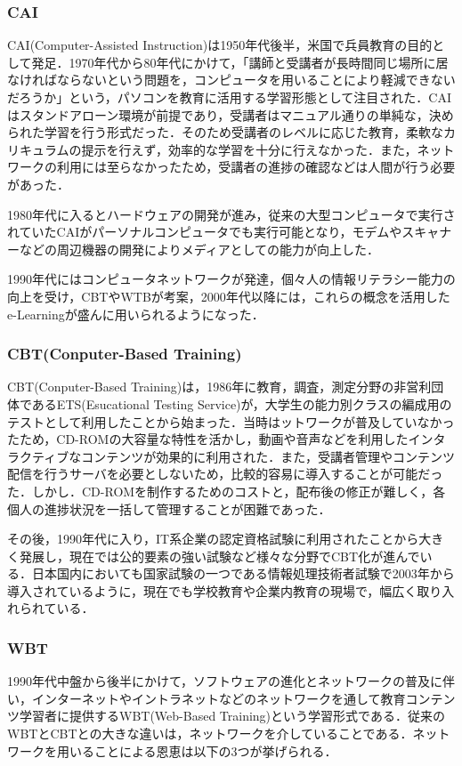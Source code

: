 \documentclass[a4j,12pt]{jsarticle}
\begin{document}
\subsubsection{CAI}
CAI(Computer-Assisted Instruction)は1950年代後半，米国で兵員教育の目的として発足．1970年代から80年代にかけて，「講師と受講者が長時間同じ場所に居なければならないという問題を，コンピュータを用いることにより軽減できないだろうか」という，パソコンを教育に活用する学習形態として注目された．CAIはスタンドアローン環境が前提であり，受講者はマニュアル通りの単純な，決められた学習を行う形式だった．そのため受講者のレベルに応じた教育，柔軟なカリキュラムの提示を行えず，効率的な学習を十分に行えなかった．また，ネットワークの利用には至らなかったため，受講者の進捗の確認などは人間が行う必要があった．

1980年代に入るとハードウェアの開発が進み，従来の大型コンピュータで実行されていたCAIがパーソナルコンピュータでも実行可能となり，モデムやスキャナーなどの周辺機器の開発によりメディアとしての能力が向上した．

1990年代にはコンピュータネットワークが発達，個々人の情報リテラシー能力の向上を受け，CBTやWTBが考案，2000年代以降には，これらの概念を活用したe-Learningが盛んに用いられるようになった．

\subsubsection{CBT(Conputer-Based Training)}
CBT(Conputer-Based Training)は，1986年に教育，調査，測定分野の非営利団体であるETS(Esucational Testing Service)が，大学生の能力別クラスの編成用のテストとして利用したことから始まった．当時はットワークが普及していなかったため，CD-ROMの大容量な特性を活かし，動画や音声などを利用したインタラクティブなコンテンツが効果的に利用された．また，受講者管理やコンテンツ配信を行うサーバを必要としないため，比較的容易に導入することが可能だった．しかし．CD-ROMを制作するためのコストと，配布後の修正が難しく，各個人の進捗状況を一括して管理することが困難であった．

その後，1990年代に入り，IT系企業の認定資格試験に利用されたことから大きく発展し，現在では公的要素の強い試験など様々な分野でCBT化が進んでいる．日本国内においても国家試験の一つである情報処理技術者試験で2003年から導入されているように，現在でも学校教育や企業内教育の現場で，幅広く取り入れられている．

\subsubsection{WBT}
1990年代中盤から後半にかけて，ソフトウェアの進化とネットワークの普及に伴い，インターネットやイントラネットなどのネットワークを通して教育コンテンツ学習者に提供するWBT(Web-Based Training)という学習形式である．従来のWBTとCBTとの大きな違いは，ネットワークを介していることである．ネットワークを用いることによる恩恵は以下の3つが挙げられる．
\end{document}
